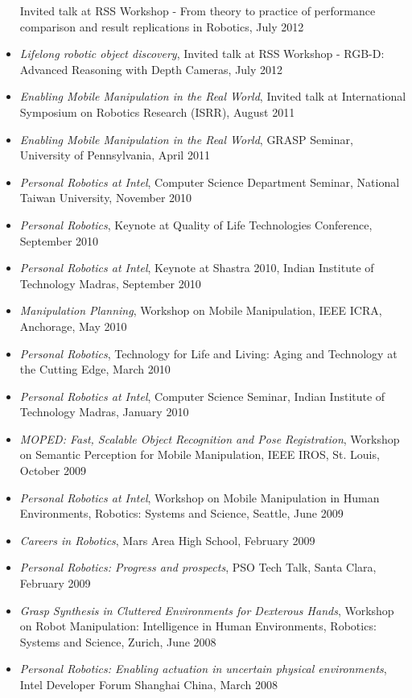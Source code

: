 \begin{itemize}
Invited talk at RSS Workshop - From theory to practice of performance comparison and result replications in Robotics, July 2012
\item \textit{Lifelong robotic object discovery},
Invited talk at RSS Workshop - RGB-D: Advanced Reasoning with Depth Cameras, July 2012
\item \textit{Enabling Mobile Manipulation in the Real World},
Invited talk at International Symposium on Robotics Research (ISRR), August 2011
\item \textit{Enabling Mobile Manipulation in the Real World},
GRASP Seminar, University of Pennsylvania, April 2011
\item \textit{Personal Robotics at Intel},
Computer Science Department Seminar, National Taiwan University, November 2010
\item \textit{Personal Robotics},
Keynote at Quality of Life Technologies Conference, September 2010
\item \textit{Personal Robotics at Intel},
Keynote at Shastra 2010, Indian Institute of Technology Madras, September 2010
\item \textit{Manipulation Planning},
Workshop on Mobile Manipulation, IEEE ICRA, Anchorage, May 2010
\item \textit{Personal Robotics},
Technology for Life and Living: Aging and Technology at the Cutting Edge, March 2010
\item \textit{Personal Robotics at Intel},
Computer Science Seminar, Indian Institute of Technology Madras, January 2010
\item \textit{MOPED: Fast, Scalable Object Recognition and Pose Registration},
Workshop on Semantic Perception for Mobile Manipulation,
IEEE IROS, St. Louis, October 2009
\item \textit{Personal Robotics at Intel},
Workshop on Mobile Manipulation in Human Environments,
Robotics: Systems and Science, Seattle, June 2009
\item \textit{Careers in Robotics},
Mars Area High School, February 2009
\item \textit{Personal Robotics: Progress and prospects},
PSO Tech Talk, Santa Clara, February 2009
\item \textit{Grasp Synthesis in Cluttered Environments for Dexterous Hands},
Workshop on Robot Manipulation: Intelligence in Human Environments,
Robotics: Systems and Science, Zurich, June 2008
\item \textit{Personal Robotics: Enabling actuation in uncertain physical environments},
Intel Developer Forum Shanghai China, March 2008

\end{itemize}
